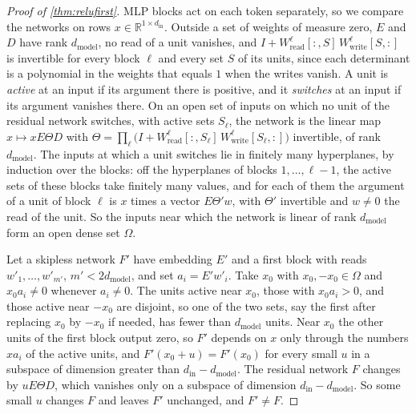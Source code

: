\documentclass[10pt]{article}
\theoremstyle{definition}
\theoremstyle{remark}
\newcommand{\R}{\mathbb{R}}
\newcommand{\Wread}{W_{\mathrm{read}}}
\newcommand{\Wwrite}{W_{\mathrm{write}}}
\newcommand{\dm}{d_{\mathrm{model}}}
\begin{document}
\begin{proof}[Proof of \cref{thm:relufirst}]
MLP blocks act on each token separately, so we compare the networks on rows $x \in \R^{1\times d_{\mathrm{in}}}$. Outside a set of weights of measure zero, $E$ and $D$ have rank $\dm$, no read of a unit vanishes, and $I + \Wread^{\ell}[{:},S]\,\Wwrite^{\ell}[S,{:}]$ is invertible for every block $\ell$ and every set $S$ of its units, since each determinant is a polynomial in the weights that equals $1$ when the writes vanish. A unit is \emph{active} at an input if its argument there is positive, and it \emph{switches} at an input if its argument vanishes there. On an open set of inputs on which no unit of the residual network switches, with active sets $S_\ell$, the network is the linear map $x \mapsto xE\Theta D$ with $\Theta = \prod_\ell\big(I + \Wread^{\ell}[{:},S_\ell]\,\Wwrite^{\ell}[S_\ell,{:}]\big)$ invertible, of rank $\dm$. The inputs at which a unit switches lie in finitely many hyperplanes, by induction over the blocks: off the hyperplanes of blocks $1, \dots, \ell-1$, the active sets of these blocks take finitely many values, and for each of them the argument of a unit of block $\ell$ is $x$ times a vector $E\Theta'w$, with $\Theta'$ invertible and $w \neq 0$ the read of the unit. So the inputs near which the network is linear of rank $\dm$ form an open dense set $\Omega$.

Let a skipless network $F'$ have embedding $E'$ and a first block with reads $w'_1, \dots, w'_{m'}$, $m' < 2\dm$, and set $a_i = E'w'_i$. Take $x_0$ with $x_0, -x_0 \in \Omega$ and $x_0a_i \neq 0$ whenever $a_i \neq 0$. The units active near $x_0$, those with $x_0a_i > 0$, and those active near $-x_0$ are disjoint, so one of the two sets, say the first after replacing $x_0$ by $-x_0$ if needed, has fewer than $\dm$ units. Near $x_0$ the other units of the first block output zero, so $F'$ depends on $x$ only through the numbers $xa_i$ of the active units, and $F'(x_0 + u) = F'(x_0)$ for every small $u$ in a subspace of dimension greater than $d_{\mathrm{in}} - \dm$. The residual network $F$ changes by $uE\Theta D$, which vanishes only on a subspace of dimension $d_{\mathrm{in}} - \dm$. So some small $u$ changes $F$ and leaves $F'$ unchanged, and $F' \neq F$.


\end{proof}
\end{document}
